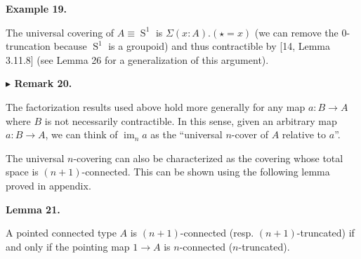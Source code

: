 \documentclass[10pt,a4paper]{article}
\begin{document}
 
 
 
\par\medskip\noindent\textbf{Example 19.}\par
 
 
The universal covering of $A\equiv\operatorname{S}^{1}$ is $\Sigma(x:A).(\star=x)$ (we can remove the 0-truncation because $\operatorname{S}^{1}$ is a groupoid) and thus contractible by [14, Lemma 3.11.8] (see Lemma 26 for a generalization of this argument).\par
 
 
 
 
\par\medskip\noindent\textbf{$\blacktriangleright$ Remark 20.}\par
 
 
The factorization results used above hold more generally for any map $a:B\to A$ where $B$ is not necessarily contractible. In this sense, given an arbitrary map $a:B\to A$, we can think of $\operatorname{im}_{n}a$ as the “universal $n$-cover of $A$ relative to $a$”.\par
 
 
 
 
The universal $n$-covering can also be characterized as the covering whose total space is $(n{+}1)$-connected. This can be shown using the following lemma proved in appendix.\par
 
 
 
\par\medskip\noindent\textbf{Lemma 21.}\par
 
 
A pointed connected type $A$ is $(n{+}1)$-connected (resp. $(n{+}1)$-truncated) if and only if the pointing map $1\to A$ is $n$-connected ($n$-truncated).\par
 
\end{document}
